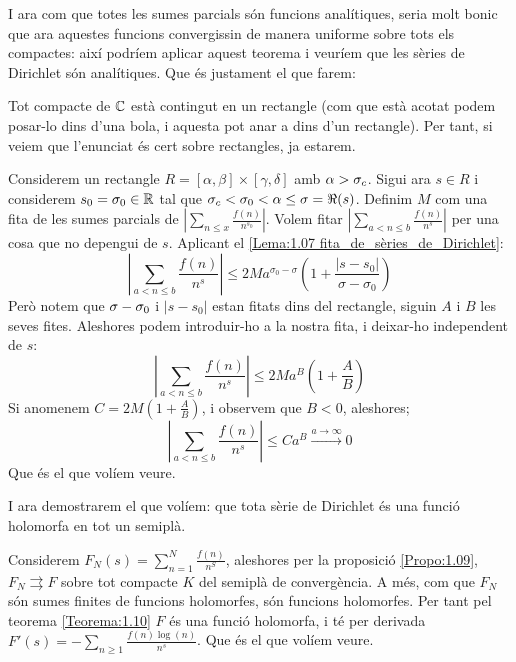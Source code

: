 I ara com que totes les sumes parcials són funcions analítiques, seria molt bonic que ara aquestes funcions convergissin de manera uniforme sobre tots els compactes: així podríem aplicar aquest teorema i veuríem que les sèries de Dirichlet són analítiques. Que és justament el que farem:
\begin{pf}
    Tot compacte de $\mathbb C$ està contingut en un rectangle (com que està acotat podem posar-lo dins d'una bola, i aquesta pot anar a dins d'un rectangle). Per tant, si veiem que l'enunciat és cert sobre rectangles, ja estarem.

    Considerem un rectangle $R=[\alpha,\beta]\times[\gamma,\delta]$ amb $\alpha>\sigma_c$. Sigui ara $s\in R$ i considerem $s_0=\sigma_0\in\mathbb R$ tal que $\sigma_c<\sigma_0<\alpha\leq\sigma=\Re(s)$. Definim $M$ com una fita de les sumes parcials de $|\sum_{n\leq x}\frac{f(n)}{n^{s_0}}|$. Volem fitar $|\sum_{a<n\leq b}\frac{f(n)}{n^s}|$ per una cosa que no depengui de $s$. Aplicant el \ref{Lema:1.07 fita_de_sèries_de_Dirichlet}:
    \[
    \left|\sum_{a<n\leq b}\frac{f(n)}{n^s}\right|\leq 2 M a^{\sigma_0-\sigma}\left(1+\frac{|s-s_0|}{\sigma-\sigma_0}\right)
    \]
    Però notem que $\sigma-\sigma_0$ i $|s-s_0|$ estan fitats dins del rectangle, siguin $A$ i $B$ les seves fites. Aleshores podem introduir-ho a la nostra fita, i deixar-ho independent de $s$:
    \[
    \left|\sum_{a<n\leq b}\frac{f(n)}{n^s}\right|\leq 2 M a^{B}\left(1+\frac{A}{B}\right)
    \]
    Si anomenem $C=2M(1+\frac{A}{B})$, i observem que $B<0$, aleshores;
    \[
    \left|\sum_{a<n\leq b}\frac{f(n)}{n^s}\right|\leq Ca^B\xrightarrow{a\rightarrow\infty}0
    \]
    Que és el que volíem veure.
\end{pf}
I ara demostrarem el que volíem: que tota sèrie de Dirichlet és una funció holomorfa en tot un semiplà.
\begin{pf}
    Considerem $F_N(s)=\sum_{n=1}^N\frac{f(n)}{n^S}$, aleshores per la proposició \ref{Propo:1.09}, $F_N\rightrightarrows F$ sobre tot compacte $K$ del semiplà de convergència. A més, com que $F_N$ són sumes finites de funcions holomorfes, són funcions holomorfes. Per tant pel teorema \ref{Teorema:1.10} $F$ és una funció holomorfa, i té per derivada $F'(s)=-\sum_{n\geq1}\frac{f(n)\log(n)}{n^s}$. Que és el que volíem veure.
\end{pf}
